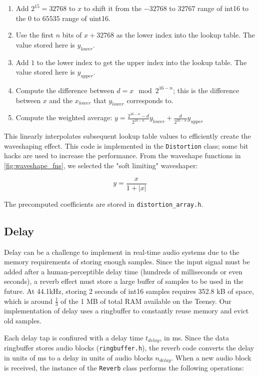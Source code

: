 \documentclass[conference]{IEEEtran}
\begin{document}
\begin{enumerate}
    \item Add $2^{15} = 32768$ to $x$ to shift it from the $-32768$ to $32767$ range of int16 to the $0$ to $65535$ range of uint16. 
    \item Use the first $n$ bits of $x + 32768$ as the lower index into the lookup table. The value stored here is $y_{lower}$.
    \item Add $1$ to the lower index to get the upper index into the lookup table. The value stored here is $y_{upper}$.
    \item Compute the difference between $d = x \mod 2^{16-n}$; this is the difference between $x$ and the $x_{lower}$ that $y_{lower}$ corresponds to.
    \item Compute the weighted average: $y = \frac{2^{16 - n} - d}{2^{16-n}} y_{lower} + \frac{d}{2^{16-n}} y_{upper}$
\end{enumerate}

This linearly interpolates subsequent lookup table values to efficiently create the waveshaping effect. This code is implemented in the  \texttt{Distortion} class; some bit hacks are used to increase the performance. From the waveshape functions in \ref{fig:waveshape_fns}, we selected the "soft limiting" waveshaper:

$$y = \frac{x}{1 + |x|}$$

The precomputed coefficients are stored in \texttt{distortion\_array.h}.

\subsection{Delay}

Delay can be a challenge to implement in real-time audio systems due to the memory requirements of storing enough samples. Since the input signal must be added after a human-perceptible delay time (hundreds of milliseconds or even seconds), a reverb effect must store a large buffer of samples to be used in the future. At 44.1kHz, storing 2 seconds of int16 samples requires 352.8 kB of space, which is around $\frac{1}{3}$ of the 1 MB of total RAM available on the Teensy. Our implementation of delay uses a ringbuffer to constantly reuse memory and evict old samples.

Each delay tap is confiured with a delay time $t_{delay}$, in ms. Since the data ringbuffer stores audio blocks (\texttt{ringbuffer.h}), the reverb code converts the delay in units of ms to a delay in units of audio blocks $n_{delay}$. When a new audio block is received, the instance of the \texttt{Reverb} class performs the following operations:
\end{document}
